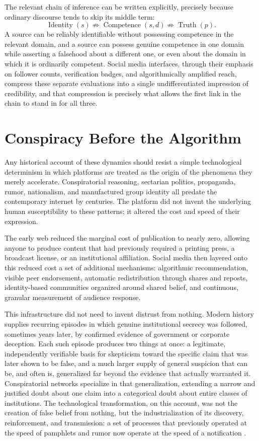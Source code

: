 \documentclass[11pt]{article}
\begin{document}
The relevant chain of inference can be written explicitly, precisely because ordinary discourse tends to skip its middle term:
\[
\operatorname{Identity}(s) \not\Rightarrow \operatorname{Competence}(s,d) \not\Rightarrow \operatorname{Truth}(p).
\]
A source can be reliably identifiable without possessing competence in the relevant domain, and a source can possess genuine competence in one domain while asserting a falsehood about a different one, or even about the domain in which it is ordinarily competent. Social media interfaces, through their emphasis on follower counts, verification badges, and algorithmically amplified reach, compress these separate evaluations into a single undifferentiated impression of credibility, and that compression is precisely what allows the first link in the chain to stand in for all three.

\section{Conspiracy Before the Algorithm}

Any historical account of these dynamics should resist a simple technological determinism in which platforms are treated as the origin of the phenomena they merely accelerate. Conspiratorial reasoning, sectarian politics, propaganda, rumor, nationalism, and manufactured group identity all predate the contemporary internet by centuries. The platform did not invent the underlying human susceptibility to these patterns; it altered the cost and speed of their expression.

The early web reduced the marginal cost of publication to nearly zero, allowing anyone to produce content that had previously required a printing press, a broadcast license, or an institutional affiliation. Social media then layered onto this reduced cost a set of additional mechanisms: algorithmic recommendation, visible peer endorsement, automatic redistribution through shares and reposts, identity-based communities organized around shared belief, and continuous, granular measurement of audience response.

This infrastructure did not need to invent distrust from nothing. Modern history supplies recurring episodes in which genuine institutional secrecy was followed, sometimes years later, by confirmed evidence of government or corporate deception. Each such episode produces two things at once: a legitimate, independently verifiable basis for skepticism toward the specific claim that was later shown to be false, and a much larger supply of general suspicion that can be, and often is, generalized far beyond the evidence that actually warranted it. Conspiratorial networks specialize in that generalization, extending a narrow and justified doubt about one claim into a categorical doubt about entire classes of institutions. The technological transformation, on this account, was not the creation of false belief from nothing, but the industrialization of its discovery, reinforcement, and transmission: a set of processes that previously operated at the speed of pamphlets and rumor now operate at the speed of a notification \cite{lazer2018science,vosoughi2018spread}.
\end{document}
